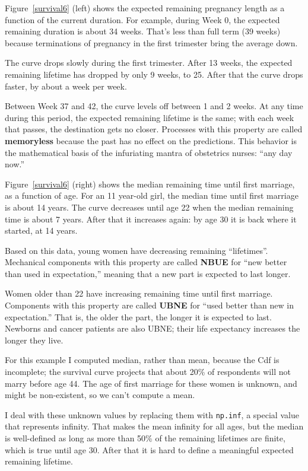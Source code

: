 \documentclass[12pt]{book}
\begin{document}
Figure~\ref{survival6} (left) shows the expected remaining pregnancy
length as a function of the current duration.  For example, during
Week 0, the expected remaining duration is about 34 weeks.  That's
less than full term (39 weeks) because terminations of pregnancy
in the first trimester bring the average down.

The curve drops slowly during the first trimester.  After 13 weeks,
the expected remaining lifetime has dropped by only 9 weeks, to
25.  After that the curve drops faster, by about a week per week.

Between Week 37 and 42, the curve levels off between 1 and 2 weeks.
At any time during this period, the expected remaining lifetime is the
same; with each week that passes, the destination gets no closer.
Processes with this property are called {\bf memoryless} because
the past has no effect on the predictions.
This behavior is the mathematical basis of the infuriating mantra
of obstetrics nurses: ``any day now.''

Figure~\ref{survival6} (right) shows the median remaining time until
first marriage, as a function of age.  For an 11 year-old girl, the
median time until first marriage is about 14 years.  The curve decreases
until age 22 when the median remaining time is about 7 years.
After that it increases again: by age 30 it is back where it started,
at 14 years.

Based on this data, young women have decreasing remaining
``lifetimes''.  Mechanical components with this property are called {\bf NBUE}
for ``new better than used in expectation,'' meaning that a new part is
expected to last longer.

Women older than 22 have increasing remaining time until first
marriage.  Components with this property are called {\bf UBNE} for
``used better than new in expectation.''  That is, the older the part,
the longer it is expected to last.  Newborns and cancer patients are
also UBNE; their life expectancy increases the longer they live.

For this example I computed median, rather than mean, because the
Cdf is incomplete; the survival curve projects that about 20\%
of respondents will not marry before age 44.  The age of
first marriage for these women is unknown, and might be non-existent,
so we can't compute a mean.

I deal with these unknown values by replacing them with {\tt np.inf},
a special value that represents infinity.  That makes the mean
infinity for all ages, but the median is well-defined as long as
more than 50\% of the remaining lifetimes are finite, which is true
until age 30.  After that it is hard to define a meaningful
expected remaining lifetime.
\end{document}
